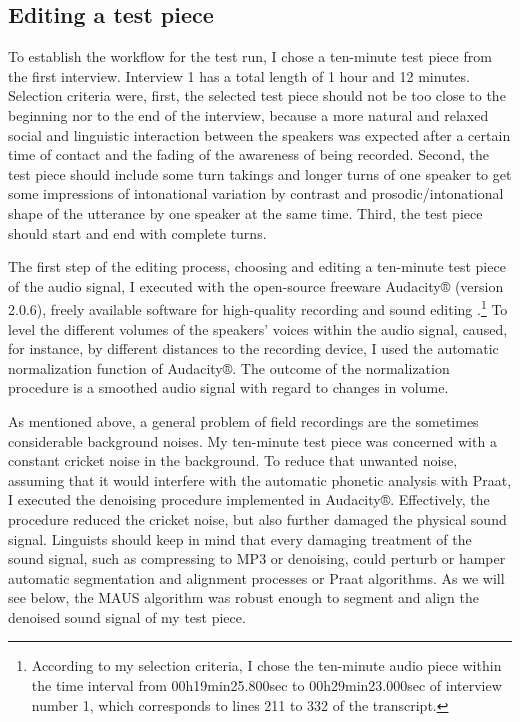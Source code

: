 \documentclass[output=paper]{langsci/langscibook}
\begin{document}
\subsection{Editing a test piece}
To establish the workflow for the test run, I chose a ten-minute test piece from the first interview. Interview 1 has a total length of 1 hour and 12 minutes. Selection criteria were, first, the selected test piece should not be too close to the beginning nor to the end of the interview, because a more natural and relaxed social and linguistic interaction between the speakers was expected after a certain time of contact and the fading of the awareness of being recorded. Second, the test piece should include some turn takings and longer turns of one speaker to get some impressions of intonational variation by contrast and prosodic/intonational shape of the utterance by one speaker at the same time. Third, the test piece should start and end with complete turns. 

The first step of the editing process, choosing and editing a ten-minute test piece of the audio signal, I executed with the open-source freeware Audacity® (version 2.0.6), freely available software for high-quality recording and sound editing \citep{AudacityTeam}.\footnote{According to my selection criteria, I chose the ten-minute audio piece within the time interval from 00h19min25.800sec to 00h29min23.000sec of interview number 1, which corresponds to lines 211 to 332 of the transcript.} To level the different volumes of the speakers’ voices within the audio signal, caused, for instance, by different distances to the recording device, I used the automatic normalization function of Audacity®. The outcome of the normalization procedure is a smoothed audio signal with regard to changes in volume.

As mentioned above, a general problem of field recordings are the sometimes considerable background noises. My ten-minute test piece was concerned with a constant cricket noise in the background. To reduce that unwanted noise, assuming that it would interfere with the automatic phonetic analysis with Praat, I executed the denoising procedure implemented in Audacity®. Effectively, the procedure reduced the cricket noise, but also further damaged the physical sound signal. Linguists should keep in mind that every damaging treatment of the sound signal, such as compressing to MP3 or denoising, could perturb or hamper automatic segmentation and alignment processes or Praat algorithms. As we will see below, the MAUS algorithm was robust enough to segment and align the denoised sound signal of my test piece.
\end{document}
